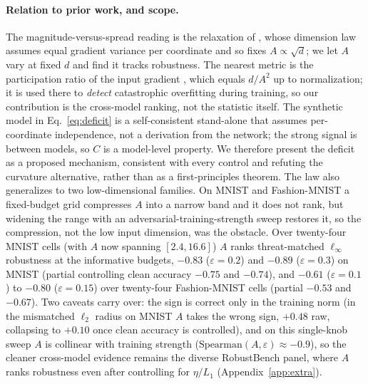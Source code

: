 \documentclass{article}
\theoremstyle{definition}
\newcommand{\dd}{d}
\begin{document}
\paragraph{Relation to prior work, and scope.}
The magnitude-versus-spread reading is the relaxation of \citet{simongabriel2019adversarial}, whose
dimension law assumes equal gradient variance per coordinate and so fixes $A\propto\sqrt\dd$; we let $A$
vary at fixed $\dd$ and find it tracks robustness. The nearest metric is the participation ratio of the
input gradient \citep{participation2025}, which equals $\dd/A^2$ up to normalization; it is used there to
\emph{detect} catastrophic overfitting during training, so our contribution is the cross-model ranking,
not the statistic itself. The synthetic model in Eq.~\ref{eq:deficit} is a
self-consistent stand-alone that assumes per-coordinate independence, not a derivation from the network;
the strong signal is between models, so $C$ is a model-level property. We therefore present the deficit
as a proposed mechanism, consistent with every control and refuting the curvature alternative, rather
than as a first-principles theorem. The law also generalizes to two low-dimensional families. On MNIST
and Fashion-MNIST a fixed-budget grid compresses $A$ into a narrow band and it does not rank, but
widening the range with an adversarial-training-strength sweep restores it, so the compression, not the
low input dimension, was the obstacle. Over twenty-four MNIST cells (with $A$ now spanning $[2.4,16.6]$)
$A$ ranks threat-matched $\ell_\infty$ robustness at the informative budgets, $-0.83$ ($\varepsilon{=}0.2$)
and $-0.89$ ($\varepsilon{=}0.3$) on MNIST (partial controlling clean accuracy $-0.75$ and $-0.74$), and
$-0.61$ ($\varepsilon{=}0.1$) to $-0.80$ ($\varepsilon{=}0.15$) over twenty-four Fashion-MNIST cells
(partial $-0.53$ and $-0.67$). Two caveats carry over: the sign is correct only in the training norm (in
the mismatched $\ell_2$ radius on MNIST $A$ takes the wrong sign, $+0.48$ raw, collapsing to $+0.10$ once
clean accuracy is controlled), and on this single-knob sweep $A$ is collinear with training strength
($\mathrm{Spearman}(A,\varepsilon)\approx-0.9$), so the cleaner cross-model evidence remains the diverse
RobustBench panel, where $A$ ranks robustness even after controlling for $\eta/L_1$
(Appendix~\ref{app:extra}).

\end{document}
